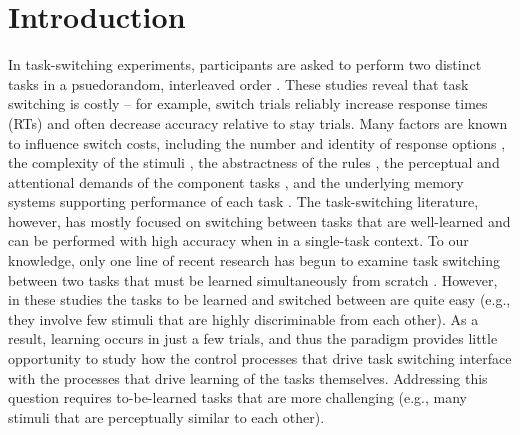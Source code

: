 \documentclass[doc, floatsintext]{apa7}
\begin{document}
\section{Introduction}
In task-switching experiments, participants are asked to
perform two distinct tasks in a psuedorandom, interleaved
order \parencite{kiesel_control_2010, monsell_task_2003}.
These studies reveal that task switching is costly -- for
example, switch trials reliably increase response times
(RTs) and often decrease accuracy relative to stay trials.
Many factors are known to influence switch costs, including
the number and identity of response options
\parencite{philipp_integration_2010, philipp_role_2011,
philipp_differential_2013}, the complexity of the stimuli
\parencite{witt_fmri_2013}, the abstractness of the rules
\parencite{stelzel_functional_2011}, the perceptual and
attentional demands of the component tasks
\parencite{arrington_tasks_2003,
chiu_domain-independent_2009, nagahama_dissociable_2001,
ravizza_shifting_2008, rushworth_components_2002}, and the
underlying memory systems supporting performance of each
task \parencite{crossley_trial-by-trial_2018,
turner_hierarchical_2017}.  The task-switching literature,
however, has mostly focused on switching between tasks that
are well-learned and can be performed with high accuracy
when in a single-task context. To our knowledge, only one
line of recent research has begun to examine task switching
between two tasks that must be learned simultaneously from
scratch \parencite{collins_cognitive_2013,
collins_human_2014, collins_neural_2016, collins_motor_2016,
collins_cost_2017}. However, in these studies the tasks to
be learned and switched between are quite easy (e.g., they
involve few stimuli that are highly discriminable from each
other). As a result, learning occurs in just a few trials,
and thus the paradigm provides little opportunity to study
how the control processes that drive task switching
interface with the processes that drive learning of the
tasks themselves. Addressing this question requires
to-be-learned tasks that are more challenging (e.g., many
stimuli that are perceptually similar to each other).
\end{document}
